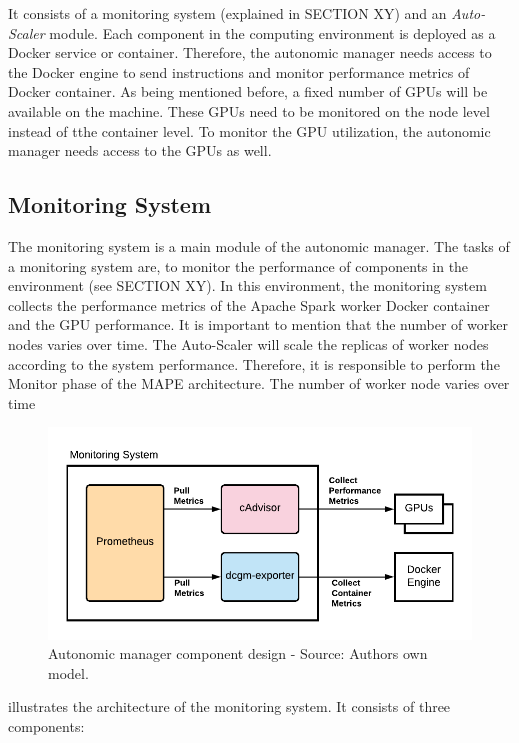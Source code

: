 It consists of a monitoring system (explained in SECTION XY) and an \textit{Auto-Scaler} module.
Each component in the computing environment is deployed as a Docker service or container. Therefore, the autonomic manager needs access to the Docker engine to send instructions and monitor performance metrics of Docker container.
As being mentioned before, a fixed number of GPUs will be available on the machine. These GPUs need to be monitored on the node level instead of tthe container level. To monitor the GPU utilization, the autonomic manager needs access to the GPUs as well.


\subsection{Monitoring System}
The monitoring system is a main module of the autonomic manager. The tasks of a monitoring system are, to monitor the performance of components in the environment (see SECTION XY).
In this environment, the monitoring system collects the performance metrics of the Apache Spark worker Docker container and the GPU performance. It is important to mention that the number of worker nodes varies over time. The Auto-Scaler will scale the replicas of worker nodes according to the system performance.
Therefore, it is responsible to perform the Monitor phase of the MAPE architecture.
The number of worker node varies over time 
\begin{figure}[h]
\centering
\includegraphics[scale=1]{images/05_conceptual_design/autonomic_manager/monitoring_system_concept}
\caption{Autonomic manager component design - Source: Authors own model.}
\label{fig:05_am_monitoring_concept}
\end{figure}
 illustrates the architecture of the monitoring system. It consists of three components:
